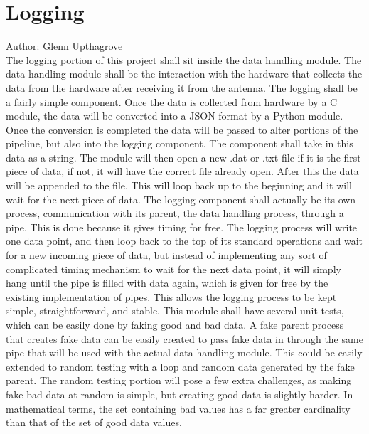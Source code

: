 \documentclass[onecolumn, draftclsnofoot,10pt, compsoc]{IEEEtran}
\begin{document}
\section {Logging}
Author: Glenn Upthagrove \\
The logging portion of this project shall sit inside the data handling module. The data handling module shall be the interaction with the hardware that collects the data from the hardware after receiving it from the antenna. The logging shall be a fairly simple component. Once the data is collected from hardware by a C module, the data will be converted into a JSON format by a Python module. Once the conversion is completed the data will be passed to alter portions of the pipeline, but also into the logging component. The component shall take in this data as a string. The module will then open a new .dat or .txt file if it is the first piece of data, if not, it will have the correct file already open. After this the data will be appended to the file. This will loop back up to the beginning and it will wait for the next piece of data. The logging component shall actually be its own process, communication with its parent, the data handling process, through a pipe. This is done because it gives timing for free. The logging process will write one data point, and then loop back to the top of its standard operations and wait for a new incoming piece of data, but instead of implementing any sort of complicated timing mechanism to wait for the next data point, it will simply hang until the pipe is filled with data again, which is given for free by the existing implementation of pipes. This allows the logging process to be kept simple, straightforward, and stable. \cite{refjson} \cite{refpython} 
This module shall have several unit tests, which can be easily done by faking good and bad data. A fake parent process that creates fake data can be easily created to pass fake data in through the same pipe that will be used with the actual data handling module. This could be easily extended to random testing with a loop and random data generated by the fake parent. The random testing portion will pose a few extra challenges, as making fake bad data at random is simple, but creating good data is slightly harder. In mathematical terms, the set containing bad values has a far greater cardinality than that of the set of good data values. 
\end{document}

